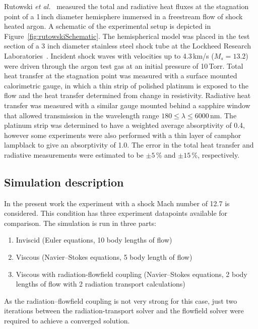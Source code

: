 Rutowski \textit{et al.}~\cite{RB64} measured the total and radiative heat fluxes at the stagnation point of a 1\,inch diameter hemisphere immersed in a freestream flow of shock heated argon.
A schematic of the experimental setup is depicted in Figure~\ref{fig:rutowskiSchematic}.
The hemispherical model was placed in the test section of a 3 inch diameter stainless steel shock tube at the Lockheed Research Laboratories~\cite{MBR+62}.  
Incident shock waves with velocities up to 4.3\,km/s ($M_s = 13.2$) were driven through the argon test gas at an initial pressure of 10\,Torr.
Total heat transfer at the stagnation point was measured with a surface mounted calorimetric gauge, in which a thin strip of polished platinum is exposed to the flow and the heat transfer determined from change in resistivity.
Radiative heat transfer was measured with a similar gauge mounted behind a sapphire window that allowed transmission in the wavelength range $180 \leq \lambda \leq 6000$\,nm.
The platinum strip was determined to have a weighted average absorptivity of 0.4, however some experiments were also performed with a thin layer of camphor lampblack to give an absorptivity of 1.0.
The error in the total heat transfer and radiative measurements were estimated to be $\pm 5$\,\% and $\pm 15$\,\%, respectively. 
 
 \subsection{Simulation description}

In the present work the experiment with a shock Mach number of 12.7 is considered.
This condition has three experiment datapoints available for comparison.
The simulation is run in three parts:

\begin{enumerate}
\item Inviscid (Euler equations, 10 body lengths of flow)
\item Viscous (Navier--Stokes equations, 5 body length of flow)
\item Viscous with radiation-flowfield coupling (Navier--Stokes equations, 2 body lengths of flow with 2 radiation transport calculations)
\end{enumerate}

As the radiation--flowfield coupling is not very strong for this case, just two iterations between the radiation-transport solver and the flowfield solver were required to achieve a converged solution.

